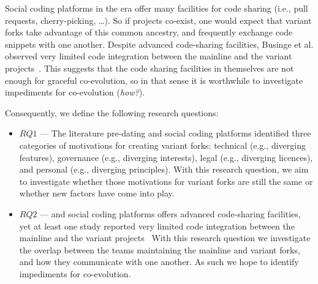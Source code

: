 Social coding platforms in the \gh era offer many facilities for code sharing (i.e., pull requests, cherry-picking, \ldots).
So if projects co-exist, one would expect that variant forks take advantage of this common ancestry, and frequently exchange code snippets with one another.
Despite advanced code-sharing facilities, Businge et al. observed very limited code integration between the mainline and the variant projects~\cite{businge:emse:2021}.
This suggests that the code sharing facilities in themselves are not enough for graceful co-evolution, so in that sense it is worthwhile to investigate impediments for co-evolution (\textit{how?}).


\newcommand*{\RQOne} [1] {Why do developers create and maintain variants on \gh?}
\newcommand*{\RQTwo} [1] {How do variant projects evolve with respect to the mainline?}


\noindent
Consequently, we define the following research questions:
\begin{itemize}
\item $RQ1$ --- \textit{\RQOne}
The literature pre-dating \git and social coding platforms identified three categories of motivations for creating variant forks: technical (e.g., diverging features), governance (e.g., diverging interests), legal (e.g., diverging licences), and personal (e.g., diverging principles).
With this research question, we aim to investigate whether those motivations for variant forks are still the same or whether new factors have come into play. 

\item $RQ2$ --- \textit{\RQTwo}
\git and social coding platforms offers advanced code-sharing facilities, yet at least one study reported very limited code integration between the mainline and the variant projects~\cite{businge:emse:2021}
With this research question we investigate the overlap between the teams maintaining the mainline and variant forks, and how they communicate with one another.
As such we hope to identify impediments for co-evolution.
\end{itemize}


